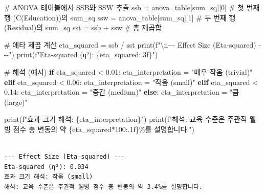 \documentclass[
  letterpaper,
]{book}
\newenvironment{Shaded}{\begin{snugshade}}{\end{snugshade}}
\newcommand{\BuiltInTok}[1]{\textcolor[rgb]{0.00,0.23,0.31}{#1}}
\newcommand{\CharTok}[1]{\textcolor[rgb]{0.13,0.47,0.30}{#1}}
\newcommand{\CommentTok}[1]{\textcolor[rgb]{0.37,0.37,0.37}{#1}}
\newcommand{\ControlFlowTok}[1]{\textcolor[rgb]{0.00,0.23,0.31}{\textbf{#1}}}
\newcommand{\DecValTok}[1]{\textcolor[rgb]{0.68,0.00,0.00}{#1}}
\newcommand{\FloatTok}[1]{\textcolor[rgb]{0.68,0.00,0.00}{#1}}
\newcommand{\NormalTok}[1]{\textcolor[rgb]{0.00,0.23,0.31}{#1}}
\newcommand{\OperatorTok}[1]{\textcolor[rgb]{0.37,0.37,0.37}{#1}}
\newcommand{\SpecialCharTok}[1]{\textcolor[rgb]{0.37,0.37,0.37}{#1}}
\newcommand{\SpecialStringTok}[1]{\textcolor[rgb]{0.13,0.47,0.30}{#1}}
\newcommand{\StringTok}[1]{\textcolor[rgb]{0.13,0.47,0.30}{#1}}
\begin{document}
\begin{Shaded}
\begin{Highlighting}[]
\CommentTok{\# ANOVA 테이블에서 SSB와 SSW 추출}
\NormalTok{ssb }\OperatorTok{=}\NormalTok{ anova\_table[}\StringTok{\textquotesingle{}sum\_sq\textquotesingle{}}\NormalTok{][}\DecValTok{0}\NormalTok{] }\CommentTok{\# 첫 번째 행 (C(Education))의 sum\_sq}
\NormalTok{ssw }\OperatorTok{=}\NormalTok{ anova\_table[}\StringTok{\textquotesingle{}sum\_sq\textquotesingle{}}\NormalTok{][}\DecValTok{1}\NormalTok{] }\CommentTok{\# 두 번째 행 (Residual)의 sum\_sq}
\NormalTok{sst }\OperatorTok{=}\NormalTok{ ssb }\OperatorTok{+}\NormalTok{ ssw }\CommentTok{\# 총 제곱합}

\CommentTok{\# 에타 제곱 계산}
\NormalTok{eta\_squared }\OperatorTok{=}\NormalTok{ ssb }\OperatorTok{/}\NormalTok{ sst}
\BuiltInTok{print}\NormalTok{(}\SpecialStringTok{f"}\CharTok{\textbackslash{}n}\SpecialStringTok{{-}{-}{-} Effect Size (Eta{-}squared) {-}{-}{-}"}\NormalTok{)}
\BuiltInTok{print}\NormalTok{(}\SpecialStringTok{f"Eta{-}squared (η²): }\SpecialCharTok{\{}\NormalTok{eta\_squared}\SpecialCharTok{:.3f\}}\SpecialStringTok{"}\NormalTok{)}

\CommentTok{\# 해석 (예시)}
\ControlFlowTok{if}\NormalTok{ eta\_squared }\OperatorTok{\textless{}} \FloatTok{0.01}\NormalTok{:}
\NormalTok{    eta\_interpretation }\OperatorTok{=} \StringTok{"매우 작음 (trivial)"}
\ControlFlowTok{elif}\NormalTok{ eta\_squared }\OperatorTok{\textless{}} \FloatTok{0.06}\NormalTok{:}
\NormalTok{    eta\_interpretation }\OperatorTok{=} \StringTok{"작음 (small)"}
\ControlFlowTok{elif}\NormalTok{ eta\_squared }\OperatorTok{\textless{}} \FloatTok{0.14}\NormalTok{:}
\NormalTok{    eta\_interpretation }\OperatorTok{=} \StringTok{"중간 (medium)"}
\ControlFlowTok{else}\NormalTok{:}
\NormalTok{    eta\_interpretation }\OperatorTok{=} \StringTok{"큼 (large)"}

\BuiltInTok{print}\NormalTok{(}\SpecialStringTok{f"효과 크기 해석: }\SpecialCharTok{\{}\NormalTok{eta\_interpretation}\SpecialCharTok{\}}\SpecialStringTok{"}\NormalTok{)}
\BuiltInTok{print}\NormalTok{(}\SpecialStringTok{f"해석: 교육 수준은 주관적 웰빙 점수 총 변동의 약 }\SpecialCharTok{\{}\NormalTok{eta\_squared}\OperatorTok{*}\DecValTok{100}\SpecialCharTok{:.1f\}}\SpecialStringTok{\%를 설명합니다."}\NormalTok{)}
\end{Highlighting}
\end{Shaded}

\begin{verbatim}

--- Effect Size (Eta-squared) ---
Eta-squared (η²): 0.034
효과 크기 해석: 작음 (small)
해석: 교육 수준은 주관적 웰빙 점수 총 변동의 약 3.4%를 설명합니다.
\end{verbatim}
\end{document}
